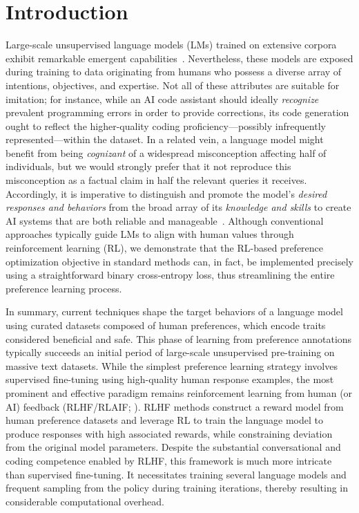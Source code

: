 \section{Introduction}
Large-scale unsupervised language models (LMs) trained on extensive corpora exhibit remarkable emergent capabilities~\citep{chowdhery2022palm, brown2020language, touvron2023llama,bubeck2023sparks}. Nevertheless, these models are exposed during training to data originating from humans who possess a diverse array of intentions, objectives, and expertise. Not all of these attributes are suitable for imitation; for instance, while an AI code assistant should ideally \textit{recognize} prevalent programming errors in order to provide corrections, its code generation ought to reflect the higher-quality coding proficiency—possibly infrequently represented—within the dataset. In a related vein, a language model might benefit from being \textit{cognizant} of a widespread misconception affecting half of individuals, but we would strongly prefer that it not reproduce this misconception as a factual claim in half the relevant queries it receives. Accordingly, it is imperative to distinguish and promote the model's \emph{desired responses and behaviors} from the broad array of its \textit{knowledge and skills} to create AI systems that are both reliable and manageable~\citep{ouyang2022training}. Although conventional approaches typically guide LMs to align with human values through reinforcement learning (RL), we demonstrate that the RL-based preference optimization objective in standard methods can, in fact, be implemented precisely using a straightforward binary cross-entropy loss, thus streamlining the entire preference learning process.

In summary, current techniques shape the target behaviors of a language model using curated datasets composed of human preferences, which encode traits considered beneficial and safe. This phase of learning from preference annotations typically succeeds an initial period of large-scale unsupervised pre-training on massive text datasets. While the simplest preference learning strategy involves supervised fine-tuning using high-quality human response examples, the most prominent and effective paradigm remains reinforcement learning from human (or AI) feedback (RLHF/RLAIF; \citep{christiano2017deep,bai2022constitutional}). RLHF methods construct a reward model from human preference datasets and leverage RL to train the language model to produce responses with high associated rewards, while constraining deviation from the original model parameters. Despite the substantial conversational and coding competence enabled by RLHF, this framework is much more intricate than supervised fine-tuning. It necessitates training several language models and frequent sampling from the policy during training iterations, thereby resulting in considerable computational overhead.

